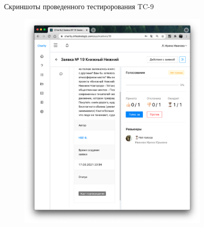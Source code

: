 \documentclass[a4paper,12pt,reqno]{article}
\begin{document}
\begin{figure}[H]
\begin{subfigure}[b]{0.475\linewidth}
		\end{subfigure}
		\caption{Скриншоты проведенного тестирорования TC-9}
	\end{figure}
	
		\newpage
	
	\begin{figure}[H]
		\centering
		\begin{subfigure}[b]{0.475\linewidth}
			\includegraphics[width=\linewidth]{img/test/5.png}
		\end{subfigure}
		\begin{subfigure}[b]{0.475\linewidth}

\end{subfigure}
\end{figure}
\end{document}
